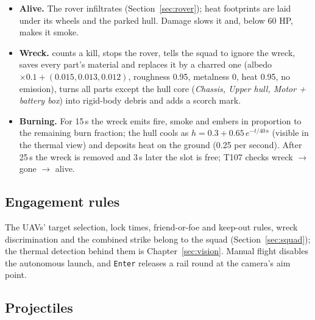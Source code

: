 \begin{itemize}
  \item \textbf{Alive.} The rover infiltrates (Section~\ref{sec:rover}); heat footprints are laid under its wheels and the parked hull. Damage slows it and, below 60 HP, makes it smoke.
  \item \textbf{Wreck.}  counts a kill, stops the rover, tells the squad to ignore the wreck, saves every part's material and replaces it by a charred one
  (albedo $\times0.1+(0.015,0.013,0.012)$, roughness 0.95, metalness 0, heat 0.95, no emission), turns all parts except the hull core
  (\emph{Chassis, Upper hull, Motor + battery box}) into rigid-body debris and adds a scorch mark.
  \item \textbf{Burning.} For 15\,s the wreck emits fire, smoke and embers in proportion to the remaining burn fraction;
  the hull cools as $h=0.3+0.65\,e^{-t/40\,\text{s}}$ (visible in the thermal view) and deposits heat on the
  ground (0.25 per second). After 25\,s the wreck is removed and 3\,s later the slot is free; T107 checks wreck $\to$ gone $\to$ alive.
\end{itemize}

\subsection{Engagement rules}\label{sec:engage}
The UAVs' target selection, lock times, friend-or-foe and keep-out rules, wreck discrimination and the combined strike
belong to the squad (Section~\ref{sec:squad}); the thermal detection behind them is Chapter~\ref{sec:vision}. Manual flight
disables the autonomous launch, and \texttt{Enter} releases a rail round at the camera's aim point.

\subsection{Projectiles}
